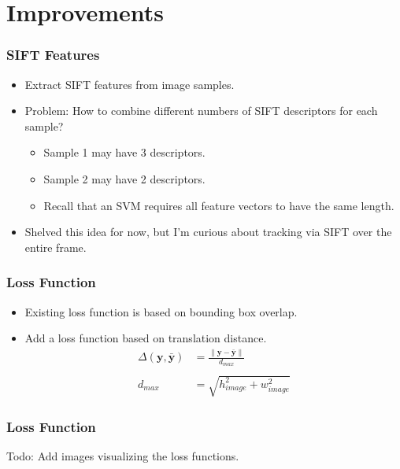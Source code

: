 \section{Improvements}

\begin{frame}
    \frametitle{SIFT Features}
    \begin{itemize}
        \item Extract SIFT features from image samples.
        \item Problem: How to combine different numbers of SIFT descriptors for each sample?
            \begin{itemize}
                \item Sample 1 may have 3 descriptors.
                \item Sample 2 may have 2 descriptors.
                \item Recall that an SVM requires all feature vectors to have the same length.
            \end{itemize}
        \item Shelved this idea for now, but I'm curious about tracking via SIFT over the entire
            frame.
    \end{itemize}
\end{frame}

\begin{frame}
    \frametitle{Loss Function}
    \begin{itemize}
        \item Existing loss function is based on bounding box overlap.
        \item Add a loss function based on translation distance.
            \begin{align}
                \Delta \left( \mathbf{y}, \mathbf{\bar{y}} \right) &= \frac{\|\mathbf{y} -
                \mathbf{\bar{y}}\|}{d_{max}} \\ \nonumber \\
                d_{max} &= \sqrt{h_{image}^2 + w_{image}^2}
            \end{align}
    \end{itemize}
\end{frame}

\begin{frame}
    \frametitle{Loss Function}
    Todo: Add images visualizing the loss functions.
\end{frame}

